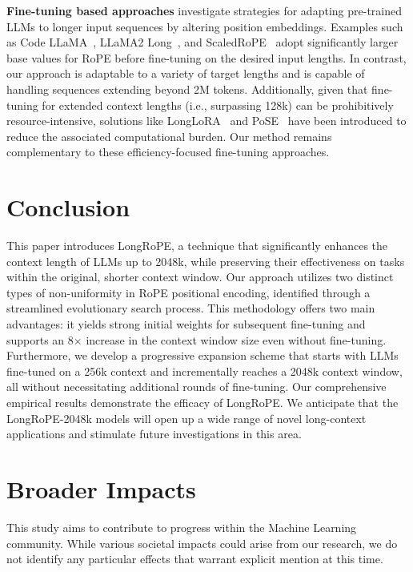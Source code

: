 \textbf{Fine-tuning based approaches} investigate strategies for adapting pre-trained LLMs to longer input sequences by altering position embeddings. Examples such as Code LLaMA~\cite{codellama}, LLaMA2 Long~\cite{xiong2023effective}, and ScaledRoPE~\cite{liu2023scaling} adopt significantly larger base values for RoPE before fine-tuning on the desired input lengths. In contrast, our approach is adaptable to a variety of target lengths and is capable of handling sequences extending beyond 2M tokens. Additionally, given that fine-tuning for extended context lengths (i.e., surpassing 128k) can be prohibitively resource-intensive, solutions like LongLoRA~\cite{longlora} and PoSE~\cite{zhu2023pose} have been introduced to reduce the associated computational burden. Our method remains complementary to these efficiency-focused fine-tuning approaches.

\section{Conclusion}

This paper introduces LongRoPE, a technique that significantly enhances the context length of LLMs up to 2048k, while preserving their effectiveness on tasks within the original, shorter context window. Our approach utilizes two distinct types of non-uniformity in RoPE positional encoding, identified through a streamlined evolutionary search process. This methodology offers two main advantages: it yields strong initial weights for subsequent fine-tuning and supports an 8$\times$ increase in the context window size even without fine-tuning. Furthermore, we develop a progressive expansion scheme that starts with LLMs fine-tuned on a 256k context and incrementally reaches a 2048k context window, all without necessitating additional rounds of fine-tuning. Our comprehensive empirical results demonstrate the efficacy of LongRoPE. We anticipate that the LongRoPE-2048k models will open up a wide range of novel long-context applications and stimulate future investigations in this area.

\section*{Broader Impacts} This study aims to contribute to progress within the Machine Learning community. While various societal impacts could arise from our research, we do not identify any particular effects that warrant explicit mention at this time.

	\balance

